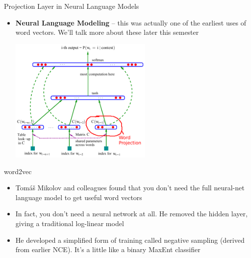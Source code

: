 \documentclass[xcolor=pdftex,x11names,table,hyperref]{beamer}
\begin{document}
\begin{frame}{Projection Layer in Neural Language Models}
\begin{itemize}
	\item \textbf{Neural Language Modeling} -- this was actually one of the earliest uses of word vectors.  We'll talk more about these later this semester \\
		\begin{center}
		\includegraphics[width=0.55\textwidth]{images/bengio-etal2003_pg6_image_alt.pdf}
		\end{center}
\end{itemize}
\end{frame}


\begin{frame}{word2vec}
\begin{itemize}
	\item Tom\'{a}\v{s} Mikolov and colleagues found that you don't need the full neural-net language model to get useful word vectors
	\pause
	\item In fact, you don't need a neural network at all. He removed the hidden layer, giving a traditional log-linear model
	\pause
	\item He developed a simplified form of training called negative sampling (derived from earlier NCE).  It's a little like a binary MaxEnt classifier
\end{itemize}
\end{frame}
\end{document}

